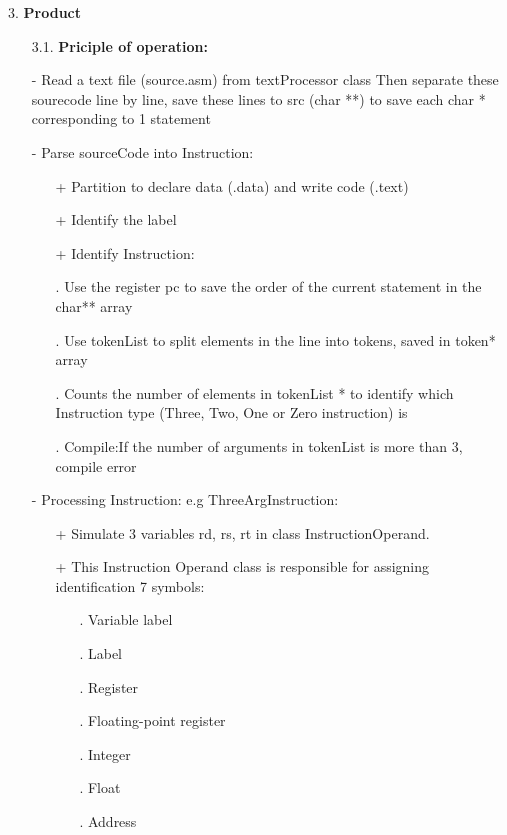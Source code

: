 \documentclass[10pt]{article}
\begin{document}
\begin{enumerate}
\begin{Large}
\item[3.] \textbf{Product}
\end{Large}
\begin{large}
\begin{enumerate}
\item[3.1.]\textbf{Priciple of operation:}
\item[-]Read a text file (source.asm) from textProcessor class
Then separate these sourecode line by line, save these lines to src (char **) to save each char * corresponding to 1 statement
\item[-]Parse sourceCode into Instruction:
\begin{enumerate}
\item[+]Partition to declare data (.data) and write code (.text)
\item[+]Identify the label
\item[+]Identify Instruction:
\end{enumerate}
\begin{enumerate}
\item[.]Use the register pc to save the order of the current statement in the char** array
\item[.]Use tokenList to split elements in the line into tokens, saved in token* array 
\item[.]Counts the number of elements in tokenList * to identify which Instruction type (Three, Two, One or Zero instruction) is
\item[.]Compile:If the number of arguments in tokenList is more than 3, compile error
\end{enumerate}
\item[-]Processing Instruction: e.g ThreeArgInstruction:
\begin{enumerate}
\item[+]Simulate 3 variables rd, rs, rt in class InstructionOperand.
\item[+]This Instruction Operand class is responsible for assigning identification 7 symbols:
\begin{enumerate}
\item[.]Variable label
\item[.]Label
\item[.]Register
\item[.]Floating-point register
\item[.]Integer
\item[.]Float
\item[.]Address

\end{enumerate}
\end{enumerate}
\end{enumerate}
\end{large}
\end{enumerate}
\end{document}
